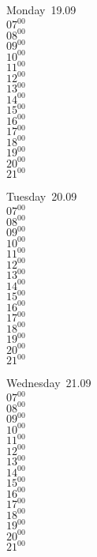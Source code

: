 \documentclass[11pt,a4paper]{book}\usepackage[]{graphicx}\usepackage[]{color}
\begin{document}
\begin{headerbox}
\end{headerbox}
\begin{weekdaybox}
  Monday~19.09\\
  { 
  \vfill
  $07^{00}$\\
$08^{00}$\\
$09^{00}$\\
$10^{00}$\\
$11^{00}$\\
$12^{00}$\\
$13^{00}$\\
$14^{00}$\\
$15^{00}$\\
$16^{00}$\\
$17^{00}$\\
$18^{00}$\\
$19^{00}$\\
$20^{00}$\\
$21^{00}$\\
  }
\end{weekdaybox}
\begin{weekdaybox}
  Tuesday~20.09\\
  { 
  \vfill
  $07^{00}$\\
$08^{00}$\\
$09^{00}$\\
$10^{00}$\\
$11^{00}$\\
$12^{00}$\\
$13^{00}$\\
$14^{00}$\\
$15^{00}$\\
$16^{00}$\\
$17^{00}$\\
$18^{00}$\\
$19^{00}$\\
$20^{00}$\\
$21^{00}$\\
  }
\end{weekdaybox}
\begin{weekdaybox}
  Wednesday~21.09\\
  { 
  \vfill
  $07^{00}$\\
$08^{00}$\\
$09^{00}$\\
$10^{00}$\\
$11^{00}$\\
$12^{00}$\\
$13^{00}$\\
$14^{00}$\\
$15^{00}$\\
$16^{00}$\\
$17^{00}$\\
$18^{00}$\\
$19^{00}$\\
$20^{00}$\\
$21^{00}$\\
  }
\end{weekdaybox}
\end{document}

